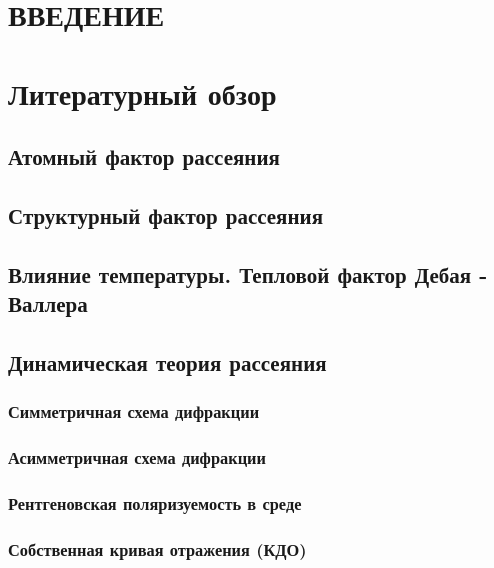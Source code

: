 \documentclass[pdftex,a4paper,14pt,english,russian]{extarticle}
\numberwithin{equation}{subsection}
\begin{document}


\setcounter{page}{5}
\begin{center}
\tableofcontents
\end{center}


\newpage
  \section*{\centering ВВЕДЕНИЕ}
  
  \newpage
\section{Литературный обзор}
  \subsection{Атомный фактор рассеяния}
    
  \subsection{Структурный фактор рассеяния}
    
  \subsection{Влияние температуры. Тепловой фактор Дебая - Валлера}
    
  \subsection{Динамическая теория рассеяния}
    \subsubsection{Симметричная схема дифракции}
      
    \subsubsection{Асимметричная схема дифракции}
      
    \subsubsection{Рентгеновская поляризуемость в среде}
      
    \subsubsection{Собственная кривая отражения (КДО)}
      
\end{document}
